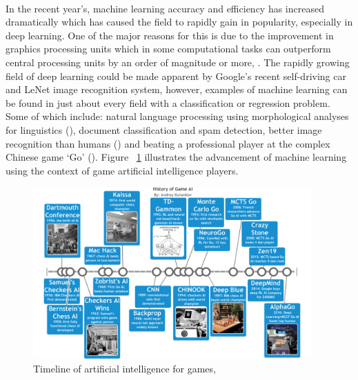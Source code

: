 \paragraph{}In the recent year's, machine learning accuracy and efficiency has increased dramatically which has caused the field to rapidly gain in popularity, especially in deep learning. One of the major reasons for this is due to the improvement in graphics processing units which in some computational tasks can outperform central processing units by an order of magnitude or more, \cite{CNNperf}. The rapidly growing field of deep learning could be made apparent by Google's recent self-driving car and LeNet image recognition system, however, examples of machine learning can be found in just about every field with a classification or regression problem. Some of which include: natural language processing using morphological analyses for linguistics (\cite{NLP}), document classification and spam detection, better image recognition than humans (\cite{manualclassifying}) and beating a professional player at the complex Chinese game ‘Go' (\cite{Gobot}). Figure ~\ref{fig:aitimeline} illustrates the advancement of machine learning using the context of game artificial intelligence players.

\begin{figure} 
   \centering
   \includegraphics[width=0.95\textwidth]{Figures/aitimeline.png}
   \caption[Timeline of artificial intelligence for games]{ Timeline of artificial intelligence for games, ~\cite{timeline}}
   \label{fig:aitimeline}
\end{figure}


